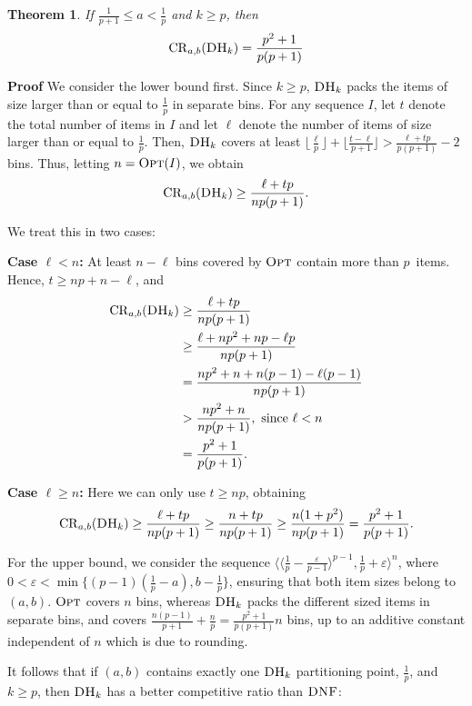 \documentclass[11pt]{article}
\newtheorem{xtheorem}{Theorem}
\newenvironment{theorem}{\begin{xtheorem}\rm}{\end{xtheorem}}
\newenvironment{proof}{\begin{trivlist}\item[]{\bf Proof }}{\hspace*{\fill}\raisebox{-1pt}{\boldmath$\Box$}\end{trivlist}}
\newcommand{\OPT}{\ensuremath{\operatorname{\textsc{Opt}}}\xspace}
\newcommand{\DNF}{\ensuremath{\operatorname{\textsc{DNF}}}\xspace}
\newcommand{\DHk}{{\ensuremath{\textsc{DH}_k}}\xspace}
\newcommand{\SEQ}[1]{\langle #1 \rangle}
\newcommand{\CRab}[1]{\ensuremath{\mathrm{CR}_{a,b}(#1)}\xspace}
\newcommand{\MINinline}[1]{\min\{#1\}}
\newcommand{\p}{p}
\begin{document}
\begin{theorem}\label{lemma-Har-2int}
If $\frac{1}{\p+1} \leq a < \frac{1}{\p}$ and $k \geq \p$, then 
\[\CRab{\DHk} = \frac{\p^2+1}{\p(\p+1)}\]
\end{theorem}
\begin{proof}
We consider the lower bound first.
Since $k \geq \p$, \DHk packs the items of size larger than or equal
 to $\frac{1}{\p}$ in separate bins.
For any sequence $I$, let $t$ denote the total number of items in $I$ and
let $\ell$ denote the number of items of size larger than or equal to
$\frac{1}{\p}$.
Then, \DHk covers at least
$\lfloor\frac{\ell}{\p}\rfloor+\lfloor\frac{t-\ell}{\p+1}\rfloor>\frac{\ell+t\p}{\p(\p+1)}-2$
bins. 
Thus, letting $n=\OPT(I)$, we obtain 
$$\CRab{\DHk} \geq \frac{\ell+t\p}{n\p(\p+1)}.$$

We treat this in two cases:

\textbf{Case $\ell < n$:} At least $n-\ell$ bins covered by \OPT contain more than $\p$~items.
Hence, $t\geq n\p + n - \ell$,
and
\begin{align*}
\CRab{\DHk}
& \geq \frac{\ell+t\p}{n\p(\p+1)}\\
& \geq \frac{\ell+n \p^2+n\p-\ell\p}{n \p (\p+1)}\\
& =    \frac{n\p^2 + n + n(\p-1) - \ell(\p-1)}{n \p (\p+1)}\\
& >    \frac{n\p^2+n}{n \p (\p+1)}, \text{ since } \ell<n\\
& = \frac{\p^2+1}{\p(\p+1)}.
\end{align*}

\textbf{Case $\ell \geq n$:}
Here we can only use $t \geq n \p$, obtaining
\[
\CRab{\DHk}
\geq
\frac{\ell+t \p}{n \p (\p+1)} \geq \frac{n+t \p}{n \p (\p+1)} \geq \frac{n(1+\p^2)}{n\p(\p+1)}=\frac{\p^2+1}{\p(\p+1)}.
\]

For the upper bound,
we consider the sequence $\SEQ{\SEQ{\frac{1}{\p}- \frac{\varepsilon}{\p-1}}^{\p-1},\frac{1}{\p}+\varepsilon}^n$,
where $0 < \varepsilon < \MINinline{(\p-1)(\frac{1}{\p}-a),b-\frac{1}{\p}}$,
ensuring that both item sizes belong to $(a,b)$.
\OPT covers $n$ bins, whereas
\DHk packs the different sized items in separate bins,
and covers $\frac{n(\p-1)}{\p+1}+\frac{n}{\p} = \frac{\p^2+1}{\p(\p+1)}n$ bins,
up to an additive constant independent of $n$ which is due to rounding.
\end{proof}

It follows that if $(a,b)$ contains exactly one \DHk partitioning
point, $\frac{1}{\p}$, and $k \geq \p$, then \DHk has a better competitive ratio than \DNF:
\end{document}

